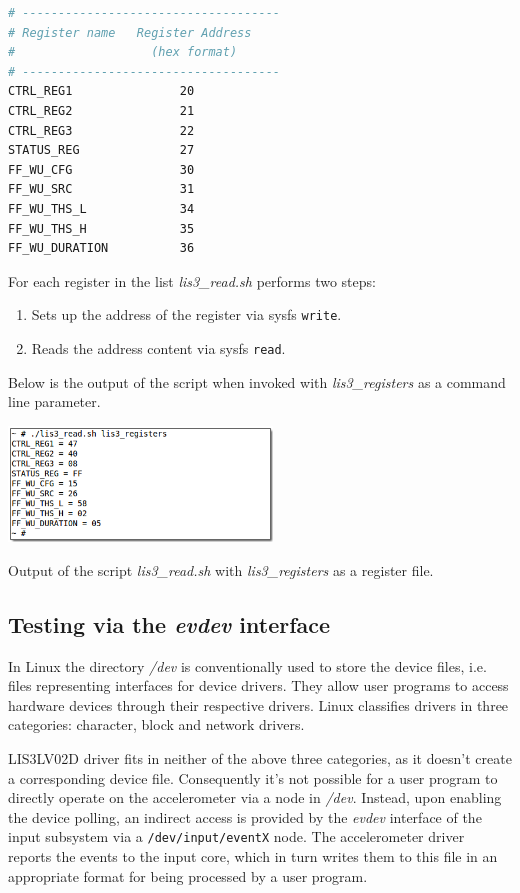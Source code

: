 \documentclass[a4paper,10pt]{article}
\makeatletter
\newenvironment{figurehere}{\def\@captype{figure}\vspace{2ex}}{\vspace{2ex}}
\newenvironment{packedenum}{
\begin{enumerate}
  \setlength{\itemsep}{3pt}
  \setlength{\parskip}{0pt}
  \setlength{\parsep}{0pt}
}{\end{enumerate}}
\newcommand{\keyword}[1]{\texttt{#1}}
\makeatother
\begin{document}
\begin{multicols}{2}
\begin{lstlisting}[language=bash]
# ------------------------------------
# Register name   Register Address
#                   (hex format)
# ------------------------------------
CTRL_REG1               20
CTRL_REG2               21
CTRL_REG3               22
STATUS_REG              27
FF_WU_CFG               30
FF_WU_SRC               31
FF_WU_THS_L             34
FF_WU_THS_H             35
FF_WU_DURATION          36
\end{lstlisting}

For each register in the list \emph{lis3\_read.sh} performs two steps:

\begin{packedenum}
	\item Sets up the address of the register via sysfs \keyword{write}.
	\item Reads the address content via sysfs \keyword{read}.
\end{packedenum}

Below is the output of the script when invoked with \emph{lis3\_registers}
as a command line parameter.

\begin{figurehere}
 \centering
 \includegraphics[width=7cm]{./figures/dump-lis3-read.png}
 \caption{Output of the script \emph{lis3\_read.sh} with \emph{lis3\_registers}
 	as a register file.}
 \label{fig:lis3-read}
\end{figurehere}


\subsection{Testing via the \emph{evdev} interface}
\label{sec:evdev-testing}

In Linux the directory \emph{/dev} is conventionally used to store the
device files, i.e. files representing interfaces for device drivers. They
allow user programs to access hardware devices through their respective
drivers. Linux classifies drivers in three categories: character, block and
network drivers.

LIS3LV02D driver fits in neither of the above three categories, as it doesn't
create a corresponding device file.
Consequently it's not possible for a user program to directly operate on the
accelerometer via a node in \emph{/dev}.
Instead, upon enabling the device polling, an indirect access is provided by
the \emph{evdev} interface of the input subsystem via a
\keyword{/dev/input/eventX} node.
The accelerometer driver reports the events to the input core, which in turn
writes them to this file in an appropriate format for being processed by a user
program.


\end{multicols}
\end{document}

